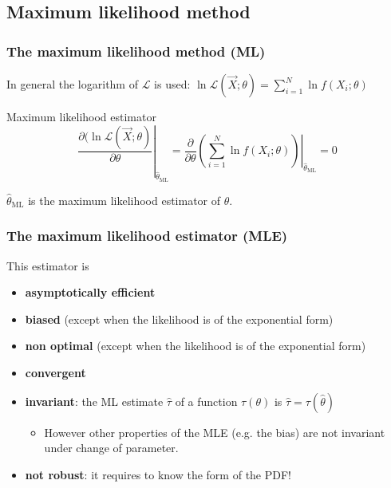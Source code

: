 \documentclass[9pt]{beamer}
\newif\ifmyhide
\newcommand\myhide[1]{%
\ifmyhide \vspace{15pt} \begin{center} \myexample{(blackboard)}\end{center} \vspace{15pt} \else #1 \fi
}
\begin{document}
\subsection{Maximum likelihood method}

\begin{frame}
 \frametitle{The maximum likelihood method (ML)}
 
 \myhide{
 In general the logarithm of $\mathcal{L}$ is used: $\ln \mathcal{L}\left(\vec{X};\theta\right) = \sum_{i=1}^N \ln f(X_i;\theta)$
 
 \begin{block}{Maximum likelihood estimator}
  $$\left. \frac{\partial (\ln \mathcal{L} \left(\vec{X};\theta\right)}{\partial \theta}\right|_{\hat{\theta}_\text{ML}} = \left.\frac{\partial}{\partial \theta} \left(  \sum_{i=1}^N \ln f(X_i;\theta) \right)\right|_{\hat{\theta}_\text{ML}} = 0$$
  
  $\hat{\theta}_\text{ML}$ is the maximum likelihood estimator of $\theta$.
 \end{block}}

 
\end{frame}

\begin{frame}
 \frametitle{The maximum likelihood estimator (MLE)}
 
 This estimator is 
 \begin{itemize}
  \item<1-> \textbf{asymptotically efficient}
  \item<2-> \textbf{biased} (except when the likelihood is of the exponential form)
  \item<3-> \textbf{non optimal} (except when the likelihood is of the exponential form)
  \item<4-> \textbf{convergent}
  \item<5-> \textbf{invariant}: the ML estimate $\hat{\tau}$ of a function $\tau(\theta)$ is $\hat{\tau} = \tau(\hat{\theta})$
  \begin{itemize}
   \item However other properties of the MLE (e.g. the bias) are not invariant under change of parameter.
  \end{itemize}
  \item<6-> \textbf{not robust}: it requires to know the form of the PDF!
 \end{itemize}
 

\end{frame}
\end{document}
